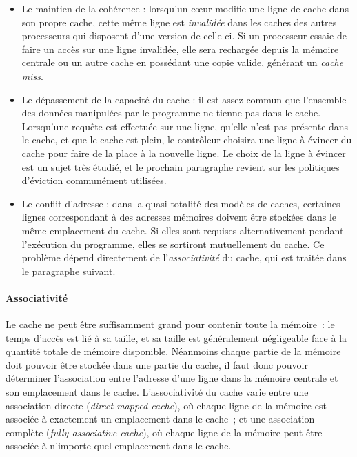 \begin{itemize}
  \item Le maintien de la cohérence : lorsqu'un cœur modifie une ligne de cache dans son propre cache, cette même ligne est \emph{invalidée} dans les caches des autres processeurs qui disposent d'une version de celle-ci.
Si un processeur essaie de faire un accès sur une ligne invalidée, elle sera rechargée depuis la mémoire centrale ou un autre cache en possédant une copie valide, générant un \emph{cache miss}.
  \item Le dépassement de la capacité du cache : il est assez commun que l'ensemble des données manipulées par le programme ne tienne pas dans le cache.
Lorsqu'une requête est effectuée sur une ligne, qu'elle n'est pas présente dans le cache, et que le cache est plein, le contrôleur choisira une ligne à évincer du cache pour faire de la place à la nouvelle ligne.
Le choix de la ligne à évincer est un sujet très étudié, et le prochain paragraphe revient sur les politiques d'éviction communément utilisées.
  \item Le conflit d'adresse : dans la quasi totalité des modèles de caches, certaines lignes correspondant à des adresses mémoires doivent être stockées dans le même emplacement du cache.
    Si elles sont requises alternativement pendant l'exécution du programme, elles se sortiront mutuellement du cache.
    Ce problème dépend directement de l'\emph{associativité} du cache, qui est traitée dans le paragraphe suivant.
\end{itemize}



\paragraph{Associativité}

Le cache ne peut être suffisamment grand pour contenir toute la mémoire~: le temps d'accès est lié à sa taille, et sa taille est généralement négligeable face à la quantité totale de mémoire disponible.
Néanmoins chaque partie de la mémoire doit pouvoir être stockée dans une partie du cache, il faut donc pouvoir déterminer l'association entre l'adresse d'une ligne dans la mémoire centrale et son emplacement dans le cache.
L'associativité du cache varie entre une association directe (\emph{direct-mapped cache}), où chaque ligne de la mémoire est associée à exactement un emplacement dans le cache~; et une association complète (\emph{fully associative cache}), où chaque ligne de la mémoire peut être associée à n'importe quel emplacement dans le cache.

